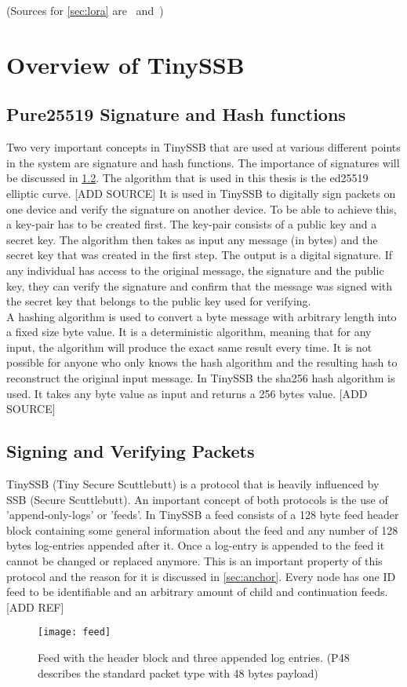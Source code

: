 (Sources for \cref{sec:lora} are~\cite{10.1007/978-3-030-01168-0_11} and~\cite{10.1145/3293534})

\section{Overview of TinySSB}
\label{sec:tiny}
\subsection{Pure25519 Signature and Hash functions}
Two very important concepts in TinySSB that are used at various different points in the system are signature and hash functions. The importance of signatures will be discussed in \cref{sec:signing}. The algorithm that is used in this thesis is the ed25519 elliptic curve. [ADD SOURCE] It is used in TinySSB to digitally sign packets on one device and verify the signature on another device. To be able to achieve this, a key-pair has to be created first. The key-pair consists of a public key and a secret key. The algorithm then takes as input any message (in bytes) and the secret key that was created in the first step. The output is a digital signature. If any individual has access to the original message, the signature and the public key, they can verify the signature and confirm that the message was signed with the secret key that belongs to the public key used for verifying. \\
A hashing algorithm is used to convert a byte message with arbitrary length into a fixed size byte value. It is a deterministic algorithm, meaning that for any input, the algorithm will produce the exact same result every time. It is not possible for anyone who only knows the hash algorithm and the resulting hash to reconstruct the original input message. 
In TinySSB the sha256 hash algorithm is used. It takes any byte value as input and returns a 256 bytes value. [ADD SOURCE]

\subsection{Signing and Verifying Packets}
\label{sec:signing}
TinySSB (Tiny Secure Scuttlebutt) is a protocol that is heavily influenced by SSB (Secure Scuttlebutt). An important concept of both protocols is the use of 'append-only-logs' or 'feeds'. In TinySSB a feed consists of a 128 byte feed header block containing some general information about the feed and any number of 128 bytes log-entries appended after it. Once a log-entry is appended to the feed it cannot be changed or replaced anymore. This is an important property of this protocol and the reason for it is discussed in \cref{sec:anchor}. Every node has one ID feed to be identifiable and an arbitrary amount of child and continuation feeds. [ADD REF]
\begin{figure}
\centering
\texttt{[image: feed]}
\caption{Feed with the header block and three appended log entries. (P48 describes the standard packet type with 48 bytes payload)}
\label{fig:feed}
\end{figure}

